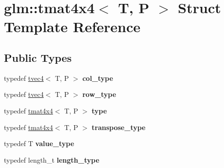 \hypertarget{structglm_1_1tmat4x4}{\section{glm\-:\-:tmat4x4$<$ T, P $>$ Struct Template Reference}
\label{structglm_1_1tmat4x4}
}
\subsection*{Public Types}
\begin{DoxyCompactItemize}
\item 
\hypertarget{structglm_1_1tmat4x4_ac879ae9669b754551245231ee992a1ea}{typedef \hyperlink{structglm_1_1tvec4}{tvec4}$<$ T, P $>$ {\bfseries col\-\_\-type}}\label{structglm_1_1tmat4x4_ac879ae9669b754551245231ee992a1ea}

\item 
\hypertarget{structglm_1_1tmat4x4_a496208229e8d8b1bd58b20584eb6011c}{typedef \hyperlink{structglm_1_1tvec4}{tvec4}$<$ T, P $>$ {\bfseries row\-\_\-type}}\label{structglm_1_1tmat4x4_a496208229e8d8b1bd58b20584eb6011c}

\item 
\hypertarget{structglm_1_1tmat4x4_a74740b596830a6a4c28f8e33965c9d3e}{typedef \hyperlink{structglm_1_1tmat4x4}{tmat4x4}$<$ T, P $>$ {\bfseries type}}\label{structglm_1_1tmat4x4_a74740b596830a6a4c28f8e33965c9d3e}

\item 
\hypertarget{structglm_1_1tmat4x4_ad1fd4876433fc643c5445fff52be9dc8}{typedef \hyperlink{structglm_1_1tmat4x4}{tmat4x4}$<$ T, P $>$ {\bfseries transpose\-\_\-type}}\label{structglm_1_1tmat4x4_ad1fd4876433fc643c5445fff52be9dc8}

\item 
\hypertarget{structglm_1_1tmat4x4_a1317abc40eb95911feacd54ee09cabc5}{typedef T {\bfseries value\-\_\-type}}\label{structglm_1_1tmat4x4_a1317abc40eb95911feacd54ee09cabc5}

\item 
\hypertarget{structglm_1_1tmat4x4_aff2734210dc0f3c3c60c49bb1f3e8864}{typedef length\-\_\-t {\bfseries length\-\_\-type}}\label{structglm_1_1tmat4x4_aff2734210dc0f3c3c60c49bb1f3e8864}

\end{DoxyCompactItemize}
